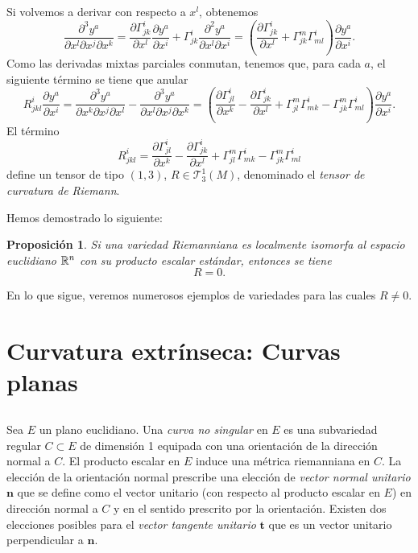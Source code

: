 \documentclass[11pt,a4paper]{amsbook}
\newtheorem{prop}[subsection]{Proposición}
\theoremstyle{remark} \newtheorem{rmk}[subsection]{Observación}
\theoremstyle{definition} \newtheorem{defn}[subsection]{Definición}
\theoremstyle{definition} \newtheorem{ex}[subsection]{Ejemplo}
\theoremstyle{definition} \newtheorem{ej}[subsection]{Ejercicio}
\begin{document}
Si volvemos a derivar con respecto a $x^l$, obtenemos
\begin{equation*}
\frac{\partial^3 y^a}{\partial x^l \partial x^j \partial x^k} = \frac{\partial \Gamma^i_{jk}}{\partial x^l} \frac{\partial y^a}{\partial x^i} + \Gamma^i_{jk} \frac{\partial^2 y^a}{\partial x^l \partial x^i} = \left( \frac{\partial \Gamma^i_{jk}}{\partial x^l} + \Gamma^m_{jk} \Gamma^i_{ml} \right) \frac{\partial y^a}{\partial x^i}.
\end{equation*}
Como las derivadas mixtas parciales conmutan, tenemos que, para cada $a$, el siguiente término se tiene que anular
\begin{equation*}
R^i_{jkl} \frac{\partial y^a}{\partial x^i} =\frac{\partial^3 y^a}{\partial x^k \partial x^j \partial x^l} - \frac{\partial^3 y^a}{\partial x^l \partial x^j \partial x^k} =\left( \frac{\partial \Gamma^i_{jl}}{\partial x^k} - \frac{\partial \Gamma^i_{jk}}{\partial x^l} +\Gamma^{m}_{jl} \Gamma^i_{mk} - \Gamma^m_{jk}\Gamma^i_{ml}  \right) \frac{\partial y^a}{\partial x^i} .
\end{equation*}
El término
\begin{equation*}
R^{i}_{jkl} = \frac{\partial \Gamma^i_{jl}}{\partial x^k} - \frac{\partial \Gamma^i_{jk}}{\partial x^l} +\Gamma^{m}_{jl} \Gamma^i_{mk} - \Gamma^m_{jk}\Gamma^i_{ml}
\end{equation*}
define un tensor de tipo $(1,3)$, $R\in \mathcal{T}^1_3(M)$, denominado el \emph{tensor de curvatura de Riemann}.

Hemos demostrado lo siguiente:

\begin{prop}
  Si una variedad Riemanniana es localmente isomorfa al espacio euclidiano $\mathbb R^n$ con su producto escalar estándar, entonces se tiene
  \begin{equation*}
R=0.
  \end{equation*}
\end{prop}

En lo que sigue, veremos numerosos ejemplos de variedades para las cuales $R\neq0$.

\section{Curvatura extrínseca: Curvas planas}

\subsection{} Sea $E$ un plano euclidiano. Una \emph{curva no singular} en $E$ es una subvariedad regular $C\subset E$ de dimensión 1 equipada con una orientación de la dirección normal a $C$. El producto escalar en $E$ induce una métrica riemanniana en $C$. La elección de la orientación normal prescribe una elección de \emph{vector normal unitario} $\bm{n}$ que se define como el vector unitario (con respecto al producto escalar en $E$) en dirección normal a $C$ y en el sentido prescrito por la orientación. Existen dos elecciones posibles para el \emph{vector tangente unitario}
$\bm{t}$
que es un vector unitario perpendicular a $\bm{n}$.
\end{document}
